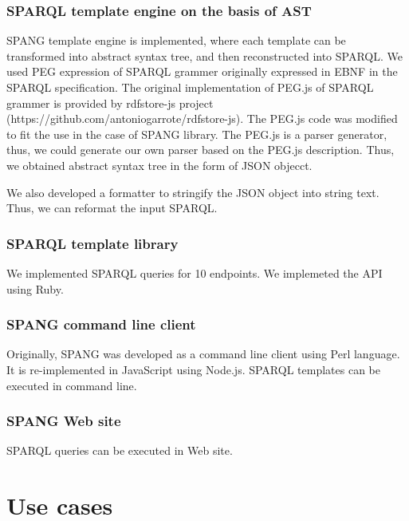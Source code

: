 \documentclass[runningheads]{llncs}
\begin{document}
\subsubsection{SPARQL template engine on the basis of AST}
SPANG template engine is implemented, where each template can be transformed into abstract syntax tree, and then reconstructed into SPARQL. 
We used PEG expression of SPARQL grammer originally expressed in EBNF in the SPARQL specification. The original implementation of PEG.js of SPARQL grammer is provided by rdfstore-js project (https://github.com/antoniogarrote/rdfstore-js).
The PEG.js code was modified to fit the use in the case of SPANG library.
The PEG.js is a parser generator, thus, we could generate our own parser based on the PEG.js description. Thus, we obtained abstract syntax tree in the form of JSON objecct.

We also developed a formatter to stringify the JSON object into string text. Thus, we can reformat the input SPARQL.

\subsubsection{SPARQL template library}
We implemented SPARQL queries for 10 endpoints.
We implemeted the API using Ruby.

\subsubsection{SPANG command line client}
Originally, SPANG was developed as a command line client using Perl language.
It is re-implemented in JavaScript using Node.js.
SPARQL templates can be executed in command line.

\subsubsection{SPANG Web site}
SPARQL queries can be executed in Web site.




\section{Use cases}

\end{document}
